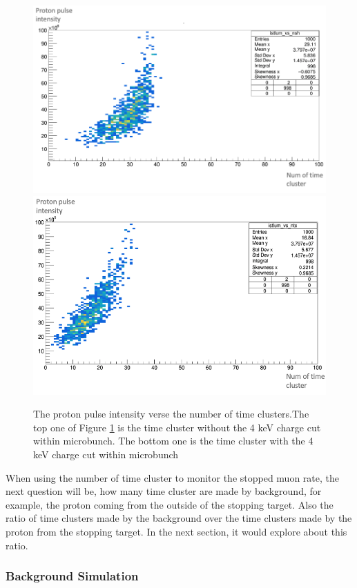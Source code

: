 \documentclass[12pt]{extarticle}
\begin{document}
\begin{figure}[H]
\centering
\includegraphics[width=0.8\linewidth]{figure/Lum_vs_timecluster_nocut.png}
\includegraphics[width=0.79\linewidth]{figure/Lum_vs_timecluster_cutQ.png}
\caption{The proton pulse intensity verse the number of time clusters.The top one of Figure \ref{Lum_vs_tc} is the time cluster without the 4 keV charge cut within microbunch. The bottom one is the time cluster with the 4 keV charge cut within microbunch}
\label{Lum_vs_tc}
\end{figure}
\noindent 
When using the number of time cluster to monitor the stopped muon rate, the next question will be, how many time cluster are made by background, for example, the proton coming from the outside of the stopping target.
Also the ratio of time clusters made by the background over the time clusters made by the proton from the stopping target. In the next section, it would explore about this ratio.


\subsubsection{Background Simulation}
\end{document}
